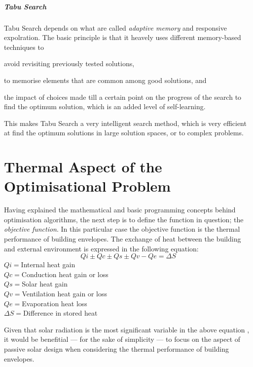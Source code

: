 \documentclass[11pt,a4paper,oneside]{article}
\begin{document}
\begin{multicols}{2}
	\subparagraph{Tabu Search}

	Tabu Search depends on what are called \emph{adaptive memory} and {responsive expolration}. The basic principle is that it heavely uses different memory-based techniques to \begin{inparaenum} \item avoid revisiting previously tested solutions, \item to memorise elements that are common among good solutions, and \item the impact of choices made till a certain point on the progress of the search to find the optimum solution, which is an added level of self-learning.\end{inparaenum}

	This makes Tabu Search a very intelligent search method, which is very efficient at find the optimum solutions in large solution spaces, or to complex problems.

\section{Thermal Aspect of the Optimisational Problem}

Having explained the mathematical and basic programming concepts behind optimisation algorithms, the next step is to define the function in question; the \emph{objective function}. In this particular case the objective function is the thermal performance of building envelopes. The exchange of heat between the building and external environment is expressed in the following equation:
\begin{equation}
	Qi\pm Qc\pm Qs\pm Qv-Qe=\Delta S
\end{equation}
\footnotesize
\indent$Qi=$Internal heat gain\\
\indent$Qc=$Conduction heat gain or loss\\
\indent$Qs=$Solar heat gain\\
\indent$Qv=$Ventilation heat gain or loss\\
\indent$Qe=$Evaporation heat loss\\
\indent$\Delta S=$Difference in stored heat\\
\normalsize

Given that solar radiation is the most significant variable in the above equation \cite{szokolay08}, it would be benefitial --- for the sake of simplicity --- to focus on the aspect of passive solar design when considering the thermal performance of building envelopes.


\end{multicols}
\end{document}
